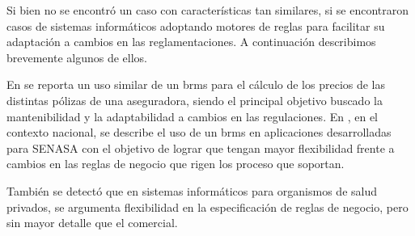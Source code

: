 Si bien no se encontró un caso con características tan similares, si se encontraron casos de sistemas informáticos adoptando motores de reglas para facilitar su adaptación a cambios en las reglamentaciones. 
A continuación describimos brevemente algunos de ellos.

En \cite{medic2019calculation} se reporta un uso similar de un \acrshort{brms} \cite{proctor2012drools} para el cálculo de los precios de las distintas pólizas de una aseguradora, siendo el principal objetivo buscado la mantenibilidad y la adaptabilidad a cambios en las regulaciones.
En \cite{sampol2019sistema}, en el contexto nacional, se describe el uso de un \acrshort{brms} en aplicaciones desarrolladas para SENASA con el objetivo de lograr que tengan mayor flexibilidad frente a cambios en las reglas de negocio que rigen los proceso que soportan.

También se detectó que en sistemas informáticos para organismos de salud privados, se argumenta flexibilidad en la especificación de reglas de negocio, pero sin mayor detalle que el comercial.
